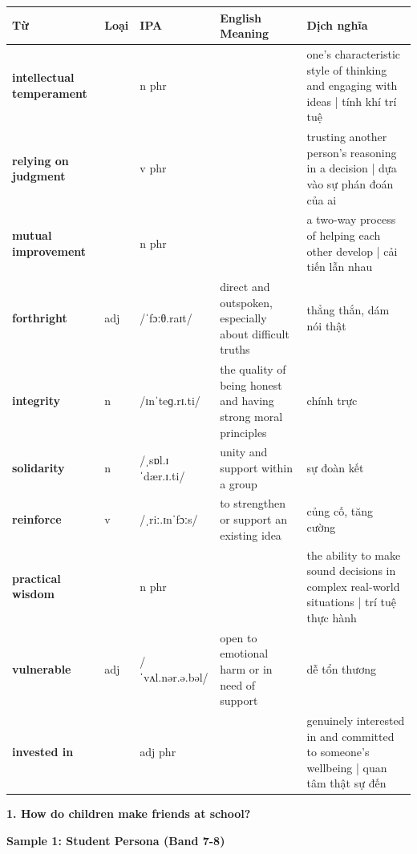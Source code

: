 \vspace{0.8em}
\begin{center}
\renewcommand{\arraystretch}{1.65}
\begin{tabularx}{\textwidth}{|V{0.22\textwidth}|C{0.07\textwidth}|I{0.20\textwidth}|Y|V{0.18\textwidth}|}
\hline
{}
\textbf{Từ} & \textbf{Loại} & \textbf{IPA} & \textbf{English Meaning} & \textbf{Dịch nghĩa} \\
\hline
\textbf{intellectual temperament} & & n phr & & one's characteristic style of thinking and engaging with ideas | tính khí trí tuệ \\ \hline
\textbf{relying on judgment} & & v phr & & trusting another person's reasoning in a decision | dựa vào sự phán đoán của ai \\ \hline
\textbf{mutual improvement} & & n phr & & a two-way process of helping each other develop | cải tiến lẫn nhau \\ \hline
\textbf{forthright} & adj & /ˈfɔːθ.raɪt/ & direct and outspoken, especially about difficult truths & thẳng thắn, dám nói thật \\ \hline
\textbf{integrity} & n & /ɪnˈteɡ.rɪ.ti/ & the quality of being honest and having strong moral principles & chính trực \\ \hline
\textbf{solidarity} & n & /ˌsɒl.ɪˈdær.ɪ.ti/ & unity and support within a group & sự đoàn kết \\ \hline
\textbf{reinforce} & v & /ˌriː.ɪnˈfɔːs/ & to strengthen or support an existing idea & củng cố, tăng cường \\ \hline
\textbf{practical wisdom} & & n phr & & the ability to make sound decisions in complex real-world situations | trí tuệ thực hành \\ \hline
\textbf{vulnerable} & adj & /ˈvʌl.nər.ə.bəl/ & open to emotional harm or in need of support & dễ tổn thương \\ \hline
\textbf{invested in} & & adj phr & & genuinely interested in and committed to someone's wellbeing | quan tâm thật sự đến \\ \hline
\end{tabularx}
\end{center}

\partthreeheader

\begin{ieltsquestion}
\textbf{1. How do children make friends at school?}
\end{ieltsquestion}
\textbf{Sample 1: Student Persona (Band 7-8)}


